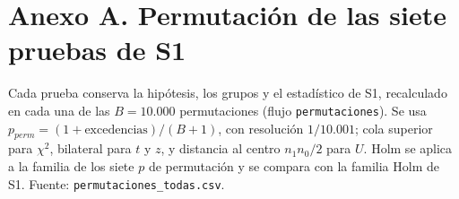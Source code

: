 \clearpage\section{Anexo A. Permutación de las siete pruebas de S1}\label{anx:A}

\setcounter{table}{0}\setcounter{figure}{0}

Cada prueba conserva la hipótesis, los grupos y el estadístico de S1, recalculado en cada una de las $B = 10.000$ permutaciones (flujo \texttt{permutaciones}). Se usa $p_{perm} = (1 + \text{excedencias})/(B + 1)$, con resolución $1/10.001$; cola superior para $\chi^2$, bilateral para $t$ y $z$, y distancia al centro $n_1 n_0/2$ para $U$. Holm se aplica a la familia de los siete $p$ de permutación y se compara con la familia Holm de S1. Fuente: \texttt{permutaciones\_todas.csv}.

